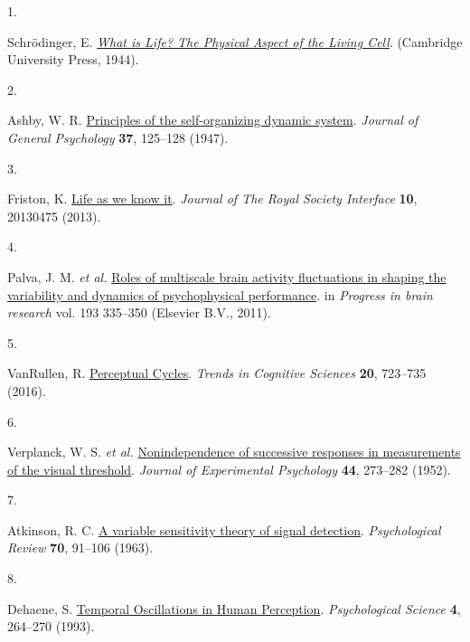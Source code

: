 \documentclass[
]{article}
\newlength{\cslhangindent}
\newlength{\csllabelwidth}
\newlength{\cslentryspacingunit} %
\newenvironment{CSLReferences}[2] %
 {%
  \setlength{\parindent}{0pt}
  \ifodd #1
  \let\oldpar\par
  \def\par{\hangindent=\cslhangindent\oldpar}
  \fi
  \setlength{\parskip}{#2\cslentryspacingunit}
 }%
 {}
\newcommand{\CSLLeftMargin}[1]{\parbox[t]{\csllabelwidth}{#1}}
\newcommand{\CSLRightInline}[1]{\parbox[t]{\linewidth - \csllabelwidth}{#1}\break}
\begin{document}
\hypertarget{refs}{}
\begin{CSLReferences}{0}{0}
\leavevmode{}%
\CSLLeftMargin{1. }%
\CSLRightInline{Schrödinger, E.
\emph{\href{http://filf.pskgu.ru/ebooks/schbio/schbio_titul.pdf}{{What
is Life? The Physical Aspect of the Living Cell}}}. (Cambridge
University Press, 1944).}

\leavevmode{}%
\CSLLeftMargin{2. }%
\CSLRightInline{Ashby, W. R.
\href{https://doi.org/10.1080/00221309.1947.9918144}{{Principles of the
self-organizing dynamic system}}. \emph{Journal of General Psychology}
\textbf{37}, 125--128 (1947).}

\leavevmode{}%
\CSLLeftMargin{3. }%
\CSLRightInline{Friston, K.
\href{https://doi.org/10.1098/rsif.2013.0475}{{Life as we know it}}.
\emph{Journal of The Royal Society Interface} \textbf{10}, 20130475
(2013).}

\leavevmode{}%
\CSLLeftMargin{4. }%
\CSLRightInline{Palva, J. M. \emph{et al.}
\href{https://doi.org/10.1016/B978-0-444-53839-0.00022-3}{{Roles of
multiscale brain activity fluctuations in shaping the variability and
dynamics of psychophysical performance}}. in \emph{Progress in brain
research} vol. 193 335--350 (Elsevier B.V., 2011).}

\leavevmode{}%
\CSLLeftMargin{5. }%
\CSLRightInline{VanRullen, R.
\href{https://doi.org/10.1016/j.tics.2016.07.006}{{Perceptual Cycles}}.
\emph{Trends in Cognitive Sciences} \textbf{20}, 723--735 (2016).}

\leavevmode{}%
\CSLLeftMargin{6. }%
\CSLRightInline{Verplanck, W. S. \emph{et al.}
\href{https://doi.org/10.1037/h0054948}{{Nonindependence of successive
responses in measurements of the visual threshold}}. \emph{Journal of
Experimental Psychology} \textbf{44}, 273--282 (1952).}

\leavevmode{}%
\CSLLeftMargin{7. }%
\CSLRightInline{Atkinson, R. C.
\href{https://doi.org/10.1037/h0041428}{{A variable sensitivity theory
of signal detection}}. \emph{Psychological Review} \textbf{70}, 91--106
(1963).}

\leavevmode{}%
\CSLLeftMargin{8. }%
\CSLRightInline{Dehaene, S.
\href{https://doi.org/10.1111/j.1467-9280.1993.tb00273.x}{{Temporal
Oscillations in Human Perception}}. \emph{Psychological Science}
\textbf{4}, 264--270 (1993).}


\end{CSLReferences}
\end{document}
